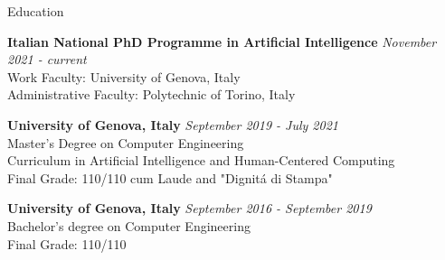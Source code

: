 \documentclass{resume} %
\begin{document}

\begin{rSection}{Education}

{\bf  Italian National PhD Programme in Artificial Intelligence} \hfill {\em November 2021 - \textit{current}} \\ 
Work Faculty: University of Genova, Italy\\
Administrative Faculty: Polytechnic of Torino, Italy

{\bf University of Genova, Italy} \hfill {\em September 2019 - July 2021} \\ 
Master's Degree on Computer Engineering \\
Curriculum in Artificial Intelligence and Human-Centered Computing \\
Final Grade: 110/110 cum Laude and "Dignit\'a di Stampa" 

{\bf University of Genova, Italy} \hfill {\em September 2016 - September 2019} \\ 
Bachelor's degree on Computer Engineering \\
Final Grade: 110/110 
\end{rSection}


\end{document}

